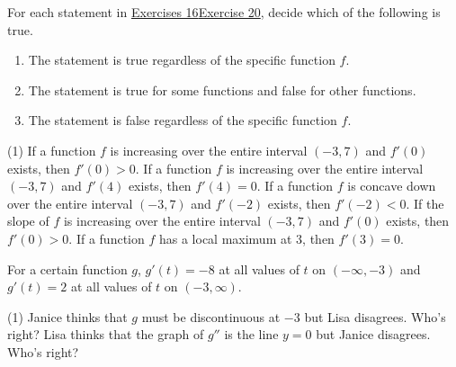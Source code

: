 \documentclass[12pt,]{book}
\newcommand{\lt}{<}
\newcommand{\gt}{>}
\theoremstyle{plain}
\theoremstyle{definition}
\numberwithin{equation}{section}
\newcommand{\fe}[2]{#1\mathopen{}\left(#2\right)\mathclose{}}
\newcommand{\ointerval}[2]{\left(#1,#2\right)}
\newcommand{\fd}[1]{#1'}
\newcommand{\sd}[1]{#1''}
\begin{document}
For each statement in \hyperlink{exercise-function-statement-first}{Exercises 16}\textendash{}\hyperlink{exercise-function-statement-last}{Exercise 20}, decide which of the following is true. %
\begin{multicols}{3}
\begin{enumerate}[label=(\alph*)]
\item{}The statement is true regardless of the specific function \(f\).\item{}The statement is true for some functions and false for other functions. \item{}The statement is false regardless of the specific function \(f\).\end{enumerate}
\end{multicols}
\par
\begin{exercisegroup}(1)
\exercise[16.]\hypertarget{exercise-function-statement-first}{\null}If a function \(f\) is increasing over the entire interval \(\ointerval{-3}{7}\) and \(\fe{\fd{f}}{0}\) exists, then \(\fe{\fd{f}}{0}\gt0\).%
\exercise[17.]\hypertarget{exercise-314}{\null}If a function \(f\) is increasing over the entire interval \(\ointerval{-3}{7}\) and \(\fe{\fd{f}}{4}\) exists, then \(\fe{\fd{f}}{4}=0\).%
\exercise[18.]\hypertarget{exercise-315}{\null}If a function \(f\) is concave down over the entire interval \(\ointerval{-3}{7}\) and \(\fe{\fd{f}}{-2}\) exists, then \(\fe{\fd{f}}{-2}\lt0\).%
\exercise[19.]\hypertarget{exercise-316}{\null}If the slope of \(f\) is increasing over the entire interval \(\ointerval{-3}{7}\) and \(\fe{\fd{f}}{0}\) exists, then \(\fe{\fd{f}}{0}\gt0\).%
\exercise[20.]\hypertarget{exercise-function-statement-last}{\null}If a function \(f\) has a local maximum at \(3\), then \(\fe{\fd{f}}{3}=0\).%
\end{exercisegroup}
\par\smallskip\noindent
For a certain function \(g\), \(\fe{\fd{g}}{t}=-8\) at all values of \(t\) on \(\ointerval{-\infty}{-3}\) and \(\fe{\fd{g}}{t}=2\) at all values of \(t\) on \(\ointerval{-3}{\infty}\).%
\par
\begin{exercisegroup}(1)
\exercise[21.]\hypertarget{exercise-318}{\null}Janice thinks that \(g\) must be discontinuous at \(-3\) but Lisa disagrees.  Who's right?%
\exercise[22.]\hypertarget{exercise-319}{\null}Lisa thinks that the graph of \(\sd{g}\) is the line \(y=0\) but Janice disagrees.  Who's right?%
\end{exercisegroup}
\par\smallskip\noindent
\end{document}
